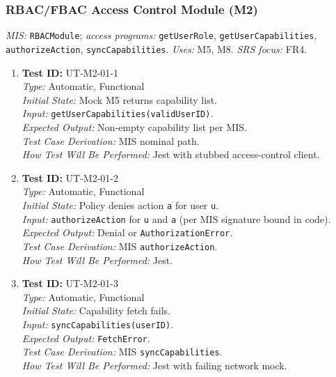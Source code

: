 \documentclass[12pt, titlepage]{article}
\begin{document}
\subsubsection{RBAC/FBAC Access Control Module (M2)}

\textit{MIS:} \texttt{RBACModule}; \textit{access programs:} \texttt{getUserRole}, \texttt{getUserCapabilities}, \texttt{authorizeAction}, \texttt{syncCapabilities}. \textit{Uses:} M5, M8. \textit{SRS focus:} FR4.

\begin{enumerate}\setlength{\itemsep}{0.85em}
    \item \textbf{Test ID:} UT-M2-01-1\\[0.25em]
    \textit{Type:} Automatic, Functional\\
    \textit{Initial State:} Mock M5 returns capability list.\\
    \textit{Input:} \texttt{getUserCapabilities(validUserID)}.\\
    \textit{Expected Output:} Non-empty capability list per MIS.\\
    \textit{Test Case Derivation:} MIS nominal path.\\
    \textit{How Test Will Be Performed:} Jest with stubbed access-control client.

    \item \textbf{Test ID:} UT-M2-01-2\\[0.25em]
    \textit{Type:} Automatic, Functional\\
    \textit{Initial State:} Policy denies action \texttt{a} for user \texttt{u}.\\
    \textit{Input:} \texttt{authorizeAction} for \texttt{u} and \texttt{a} (per MIS signature bound in code).\\
    \textit{Expected Output:} Denial or \texttt{AuthorizationError}.\\
    \textit{Test Case Derivation:} MIS \texttt{authorizeAction}.\\
    \textit{How Test Will Be Performed:} Jest.

    \item \textbf{Test ID:} UT-M2-01-3\\[0.25em]
    \textit{Type:} Automatic, Functional\\
    \textit{Initial State:} Capability fetch fails.\\
    \textit{Input:} \texttt{syncCapabilities(userID)}.\\
    \textit{Expected Output:} \texttt{FetchError}.\\
    \textit{Test Case Derivation:} MIS \texttt{syncCapabilities}.\\
    \textit{How Test Will Be Performed:} Jest with failing network mock.
\end{enumerate}
\end{document}
